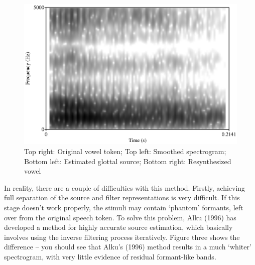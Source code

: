 \documentclass{article}\usepackage[]{graphicx}\usepackage[]{color}
\begin{document}
\begin{figure}
\includegraphics[scale=0.3,keepaspectratio]{goat_mono.eps}
\caption{Top right: Original vowel token; Top left: Smoothed spectrogram; Bottom left: Estimated glottal source; Bottom right: Resynthesized vowel}
\end{figure}
\newpage
In reality, there are a couple of difficulties with this method. Firstly, achieving full separation of the source and filter representations is very difficult. If this stage doesn't work properly, the stimuli may contain `phantom' formants, left over from the original speech token. To solve this problem, Alku (1996) has developed a method for highly accurate source estimation, which basically involves using the inverse filtering process iteratively. Figure three shows the difference -- you should see that Alku's (1996) method results in a much `whiter' spectrogram, with very little evidence of residual formant-like bands.
\end{document}
